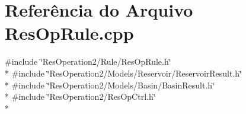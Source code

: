 \section{Referência do Arquivo Res\+Op\+Rule.\+cpp}
\label{_2_rule_2_res_op_rule_8cpp}
{\ttfamily \#include \char`\"{}Res\+Operation2/\+Rule/\+Res\+Op\+Rule.\+h\char`\"{}}\\*
{\ttfamily \#include \char`\"{}Res\+Operation2/\+Models/\+Reservoir/\+Reservoir\+Result.\+h\char`\"{}}\\*
{\ttfamily \#include \char`\"{}Res\+Operation2/\+Models/\+Basin/\+Basin\+Result.\+h\char`\"{}}\\*
{\ttfamily \#include \char`\"{}Res\+Operation2/\+Res\+Op\+Ctrl.\+h\char`\"{}}\\*
